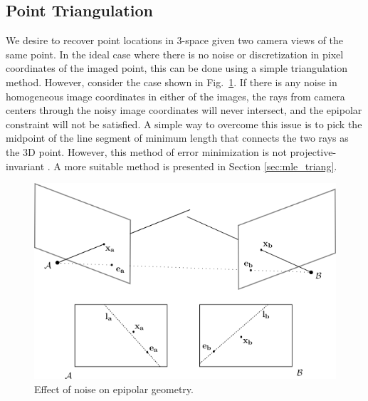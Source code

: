 	
\subsection{Point Triangulation}
	
	We desire to recover point locations in 3-space given two camera views of the same point. In the ideal case where there is no noise or discretization in pixel coordinates of the imaged point, this can be done using a simple triangulation method. However, consider the case shown in Fig.~\ref{fig:noise}. If there is any noise in homogeneous image coordinates in either of the images, the rays from camera centers through the noisy image coordinates will never intersect, and the epipolar constraint will not be satisfied. A simple way to overcome this issue is to pick the midpoint of the line segment of minimum length that connects the two rays as the 3D point. However, this method of error minimization is not projective-invariant \cite{Hartley2004}. A more suitable method is presented in Section \ref{sec:mle_triang}.
	
	\begin{figure}
		\includegraphics[width=\linewidth]{chap8_scene_reconstruction/figures/epipolar_noise}
		\caption{Effect of noise on epipolar geometry.}
		\label{fig:noise}
	\end{figure}
	
